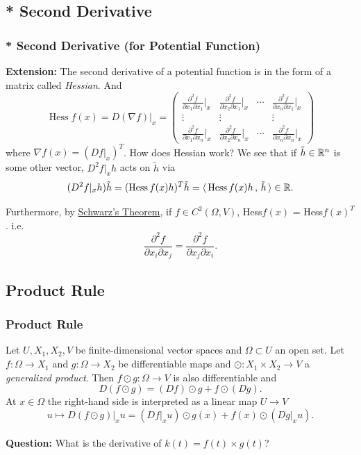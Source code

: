 \documentclass[12pt, t]{beamer}
\renewcommand{\emph}[1]{{\color{Turquoise3}\textsl{#1}}}
\newcommand{\nullspace}{~\\[15pt]}
\newcommand{\scp}[2]{\langle\,#1\,,\,#2\,\rangle} \newcommand{\scpp}{\langle\,\cdot\,,\,\cdot\,\rangle}
\begin{document}
\subsection{* Second Derivative}
\begin{frame}
    \frametitle{* Second Derivative (for Potential Function)}
    \textbf{Extension: } The second derivative of a potential function is in the form of a matrix called \emph{Hessian}. And
    $$\operatorname{Hess} f(x)=D(\nabla f)|_x=\begin{pmatrix}
            \frac{\partial^2 f}{\partial x_1\partial x_1}\Big|_x & \frac{\partial^2 f}{\partial x_2\partial x_1}\Big|_x & \cdots & \frac{\partial^2 f}{\partial x_n\partial x_1}\Big|_x \\
            \vdots                                               & \vdots                                               &        & \vdots                                               \\
            \frac{\partial^2 f}{\partial x_1\partial x_n}\Big|_x & \frac{\partial^2 f}{\partial x_2\partial x_n}\Big|_x & \cdots & \frac{\partial^2 f}{\partial x_n\partial x_n}\Big|_x
        \end{pmatrix}$$
    where $\nabla f(x) = (Df|_x)^T$.
    How does Hessian work? We see that if $\tilde{h}\in\mathbb{R}^n$ is some other vector, $D^2f|_xh$ acts on $\tilde{h}$ via
    \[(D^2f|_xh)\tilde{h}=(\text{Hess}\,f(x)h)^T\tilde{h}
        =\scp{\text{Hess}\,f(x)h}{\tilde{h}}\in\R.\]

    Furthermore, by \href{https://en.wikipedia.org/wiki/Symmetry_of_second_derivatives}{Schwarz’s Theorem}, if $f\in C^2(\Omega,V)$, Hess$f(x)$ = Hess$f(x)^T$. i.e. \[\frac{\partial^2f}{\partial x_i\partial x_j}=\frac{\partial^2f}{\partial x_j\partial x_i}.\]
\end{frame}


\subsection{Product Rule}
\begin{frame}
    \frametitle{Product Rule}
    Let $U,X_1,X_2,V$ be finite-dimensional vector spaces and $\Omega\subset U$ an open set. Let $f:\Omega\to X_1$ and $g:\Omega\to X_2$ be dif{}ferentiable maps and $\odot:X_1\times X_2\to V$ a \emph{generalized product}. Then $f\odot g:\Omega\to V$ is also dif{}ferentiable and
    \begin{equation}\label{2.2.2}
        D(f\odot g)=(Df)\odot g+f\odot(Dg).
    \end{equation}
    At $x\in\Omega$ the right-hand side is interpreted as a linear map $U\to V$
    \begin{equation}\label{2.2.3}
        u\mapsto D(f\odot g)|_xu=(Df|_xu)\odot g(x)+f(x)\odot(Dg|_xu).
    \end{equation}
    \nullspace
    \textbf{Question: }What is the derivative of $k(t)=f(t)\times g(t)$?
\end{frame}
\end{document}
